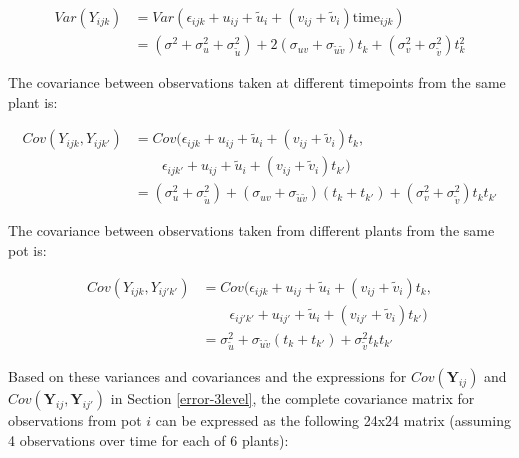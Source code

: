 \documentclass[
]{krantz}
\begin{document}
\begin{align*}
Var(Y_{ijk}) & = Var(\epsilon_{ijk}+u_{ij}+\tilde{u}_{i}+(v_{ij}+\tilde{v}_{i})\textrm{time}_{ijk}) \\
 & = (\sigma^{2} + \sigma_{u}^{2} + \sigma_{\tilde{u}}^{2}) + 2(\sigma_{uv} + \sigma_{\tilde{u}\tilde{v}})t_k + (\sigma_{v}^{2} + \sigma_{\tilde{v}}^{2})t_{k}^{2}
\end{align*}

The covariance between observations taken at different timepoints from the same plant is:

\begin{align*}
Cov(Y_{ijk},Y_{ijk'}) & = Cov(\epsilon_{ijk}+u_{ij}+\tilde{u}_{i}+(v_{ij}+\tilde{v}_{i})t_{k}, \\
 & \qquad \epsilon_{ijk'}+u_{ij}+\tilde{u}_{i}+(v_{ij}+\tilde{v}_{i})t_{k'}) \\
 & = (\sigma_{u}^{2} + \sigma_{\tilde{u}}^{2}) + (\sigma_{uv} + \sigma_{\tilde{u}\tilde{v}})(t_{k}+t_{k'}) + (\sigma_{v}^{2} + \sigma_{\tilde{v}}^{2})t_{k}t_{k'}
\end{align*}

The covariance between observations taken from different plants from the same pot is:

\begin{align*}
Cov(Y_{ijk},Y_{ij'k'}) & = Cov(\epsilon_{ijk}+u_{ij}+\tilde{u}_{i}+(v_{ij}+\tilde{v}_{i})t_{k}, \\
 & \qquad \epsilon_{ij'k'}+u_{ij'}+\tilde{u}_{i}+(v_{ij'}+\tilde{v}_{i})t_{k'}) \\
 & = \sigma_{\tilde{u}}^{2} + \sigma_{\tilde{u}\tilde{v}}(t_{k}+t_{k'}) + \sigma_{\tilde{v}}^{2}t_{k}t_{k'}
\end{align*}

Based on these variances and covariances and the expressions for \(Cov(\textbf{Y}_{ij})\) and \(Cov(\textbf{Y}_{ij},\textbf{Y}_{ij'})\) in Section \ref{error-3level}, the complete covariance matrix for observations from pot \(i\) can be expressed as the following 24x24 matrix (assuming 4 observations over time for each of 6 plants):
\end{document}

